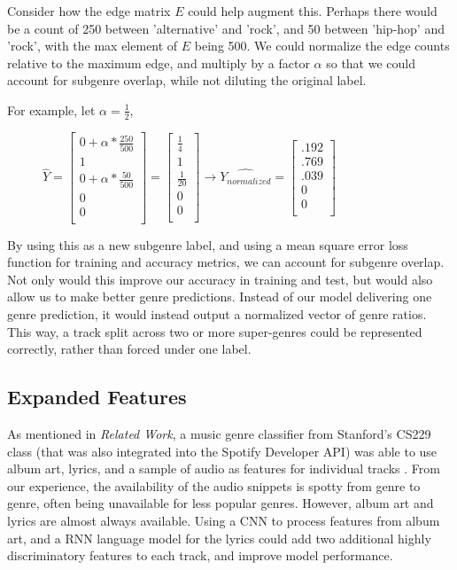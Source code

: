 \documentclass[conference]{IEEEtran}
\begin{document}
Consider how the edge matrix $E$ could help augment this. Perhaps there would be a count of 250 between 'alternative' and 'rock', and 50 between 'hip-hop' and 'rock', with the max element of $E$ being 500. We could normalize the edge counts relative to the maximum edge, and multiply by a factor $\alpha $ so that we could account for subgenre overlap, while not diluting the original label. 

For example, let $\alpha=\frac{1}{2}$,

\begin{figure}[ht]
\centering
$\hat{Y}=
\begin{bmatrix}
0+\alpha*\frac{250}{500}\\
1\\
0+\alpha*\frac{50}{500}\\
0\\
0\\
\end{bmatrix}
=
\begin{bmatrix}
\frac{1}{4}\\
1\\
\frac{1}{20}\\
0\\
0\\
\end{bmatrix}
\rightarrow
\hat{Y_{normalized}} = 
\begin{bmatrix}
.192\\
.769\\
.039\\
0\\
0\\
\end{bmatrix}
$
\end{figure}

By using this as a new subgenre label, and using a mean square error loss function for training and accuracy metrics, we can account for subgenre overlap. Not only would this improve our accuracy in training and test, but would also allow us to make better genre predictions. Instead of our model delivering one genre prediction, it would instead output a normalized vector of genre ratios. This way, a track split across two or more super-genres could be represented correctly, rather than forced under one label.

\subsection{Expanded Features}
As mentioned in \emph{Related Work}, a music genre classifier from Stanford's CS229 class (that was also integrated into the Spotify Developer API) was able to use album art, lyrics, and a sample of audio as features for individual tracks \cite{b5}. From our experience, the availability of the audio snippets is spotty from genre to genre, often being unavailable for less popular genres. However, album art and lyrics are almost always available. Using a CNN to process features from album art, and a RNN language model for the lyrics could add two additional highly discriminatory features to each track, and improve model performance.
\end{document}
